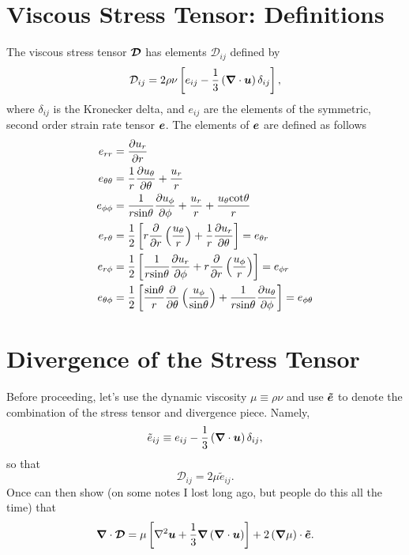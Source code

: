 \documentclass[10pt, letterpaper]{article}
\begin{document}
\section{Viscous Stress Tensor:  Definitions}
The viscous stress tensor $\boldsymbol{\mathcal{D}}$ has elements $\mathcal{D}_{ij}$ defined by
\begin{equation}
\label{eq:Dij}
\mathcal{D}_{ij}=2\rho\nu\left[e_{ij}-\frac{1}{3}\left(\boldsymbol{\nabla}\cdot\boldsymbol{u}\right)\delta_{ij}\right],
\end{equation}
where $\delta_{ij}$ is the Kronecker delta, and $e_{ij}$ are the elements of the symmetric, second order strain rate tensor $\boldsymbol{e}$.  The elements of $\boldsymbol{e}$ are defined as follows
\begin{align}
e_{rr}& = \frac{\partial u_r}{\partial r}                                              \\
e_{\theta\theta}& = \frac{1}{r}\frac{\partial u_\theta}{\partial\theta}+\frac{u_r}{r}  \\
e_{\phi\phi}& = \frac{1}{r\mathrm{sin}\theta}\frac{\partial u_\phi}{\partial\phi} +\frac{u_r}{r} + \frac{u_\theta\mathrm{cot}\theta}{r} \\
e_{r\theta}& = \frac{1}{2}\left[ r\frac{\partial}{\partial r}\left( \frac{u_\theta}{r} \right) +  \frac{1}{r}\frac{\partial u_r}{\partial\theta}  \right]    = e_{\theta r}              \\
e_{r\phi}&  = \frac{1}{2}\left[ \frac{1}{r\mathrm{sin}\theta}\frac{\partial u_r}{\partial\phi} + r\frac{\partial}{\partial r}\left(\frac{u_\phi}{r} \right)   \right]   = e_{\phi r}\\
e_{\theta\phi}& = \frac{1}{2}\left[ \frac{\mathrm{sin}\theta}{r}\frac{\partial}{\partial\theta}\left( \frac{u_\phi}{\mathrm{sin}\theta} \right) +  \frac{1}{r\mathrm{sin}\theta}\frac{\partial u_\theta}{\partial\phi}  \right] = e_{\phi\theta}
\end{align}
 
\section{Divergence of the Stress Tensor}
Before proceeding, let's use the dynamic viscosity $\mu\equiv\rho\nu$ and use $\boldsymbol{\tilde{e}}$ to denote the combination of the stress tensor and divergence piece.  Namely,
\begin{equation}
\label{eq:etwiddle}
\tilde{e}_{ij} \equiv e_{ij} - \frac{1}{3}\left(\boldsymbol{\nabla}\cdot\boldsymbol{u}\right)\delta_{ij},
\end{equation}
so that 
\begin{equation}
\mathcal{D}_{ij} = 2\mu\tilde{e}_{ij}.
\end{equation}
Once can then show (on some notes I lost long ago, but people do this all the time) that
\begin{equation}
\boldsymbol{\nabla}\cdot\boldsymbol{\mathcal{D}} = \mu\left[\nabla^2\boldsymbol{u} + \frac{1}{3}\boldsymbol{\nabla}\left(\boldsymbol{\nabla}\cdot\boldsymbol{u}\right)  \right] + 2\left(\boldsymbol{\nabla}\mu\right)\cdot\boldsymbol{\tilde{e}}.
\end{equation}
\end{document}
